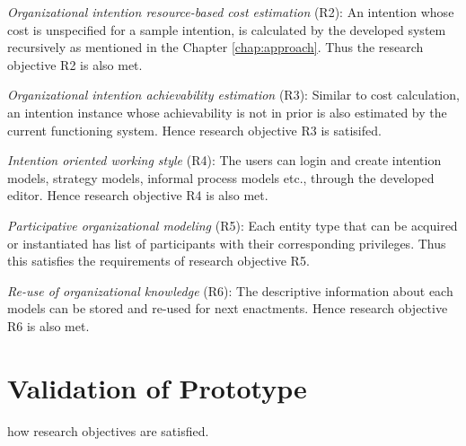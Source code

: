 \textit{Organizational intention resource-based cost estimation} (R2): An intention whose cost is unspecified for a sample intention, is calculated by the developed system recursively as mentioned in the Chapter \ref{chap:approach}. Thus the research objective R2 is also met.

\textit{Organizational intention achievability estimation} (R3): Similar to cost calculation, an intention instance whose achievability is not in prior is also estimated by the current functioning system. Hence research objective R3 is satisifed.

\textit{Intention oriented working style} (R4): The users can login and create intention models, strategy models, informal process models etc., through the developed editor. Hence research objective R4 is also met.

\textit{Participative organizational modeling} (R5): Each entity type that can be acquired or instantiated has list of participants with their corresponding privileges. Thus this satisfies the requirements of research objective R5.

\textit{Re-use of organizational knowledge} (R6): The descriptive information about each models can be stored and re-used for next enactments. Hence research objective R6 is also met.
	
\section{Validation of Prototype}
\label{sec:validationofprototype}
how research objectives are satisfied. 

	

	


